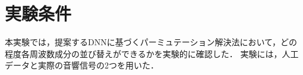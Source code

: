 \section{実験条件}
\label{sec:ex_condition}
本実験では，提案するDNNに基づくパーミュテーション解決法において，どの程度各周波数成分の並び替えができるかを実験的に確認した．
実験には，人工データと実際の音響信号の2つを用いた．
